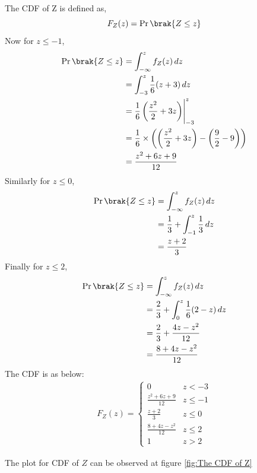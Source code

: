 \documentclass[journal,12pt,twocolumn]{IEEEtran}
\begin{document}
The CDF of Z is defined as,
\begin{equation}
    F_Z(z) = \Pr\brak{Z \le z}
\end{equation}
Now for $ z \le -1 $,
\begin{align}
    \Pr\brak{Z\le z} &=  \int_{-\infty}^{z}f_{Z}(z) \,dz  \\
          &=  \int_{-3}^{z} \dfrac{1}{6}(z+3) \,dz  \\
          &= \dfrac{1}{6} \left(\dfrac{z^2}{2}+3z \right) \Biggr|_{-3}^{z}  \\
          &=  \dfrac{1}{6} \times \left(\left(\dfrac{z^2}{2}+3z \right) - \left(\dfrac{9}{2} -9 \right)\right) \\
          &= \dfrac{z^2+6z + 9}{12} 
\end{align}
Similarly for $z \le 0$,
\begin{align}
    \Pr\brak{Z\le z} &=  \int_{-\infty}^{z}f_{Z}(z) \,dz  \\
          &=  \dfrac{1}{3} + \int_{-1}^{z} \dfrac{1}{3} \,dz  \\
          &= \dfrac{z+2}{3} 
\end{align}
Finally for $z \le 2$,
\begin{align}
    \Pr\brak{Z\le z} &=  \int_{-\infty}^{z}f_{Z}(z) \,dz  \\
          &= \dfrac{2}{3} + \int_{0}^{z} \dfrac{1}{6}(2-z) \,dz  \\
         & =  \dfrac{2}{3} +\dfrac{4z- z^2}{12} \\
         & = \dfrac{8 +4z -z^2}{12} 
\end{align}
The CDF is as below: 
\begin{align}
\label{eq:cdf_z}
F_{Z}(z)  = 
\begin{cases}
0 & z < -3
\\
\frac{z^2+6z + 9}{12} &  z \le -1
\\
\frac{z+2}{3} &  z \le 0
\\
\frac{8 +4z -z^2}{12} & z \le 2
\\
1 & z > 2
\end{cases}
\end{align}

The plot for CDF of $Z $ can be observed at figure \ref{fig:The CDF of Z}
\end{document}
